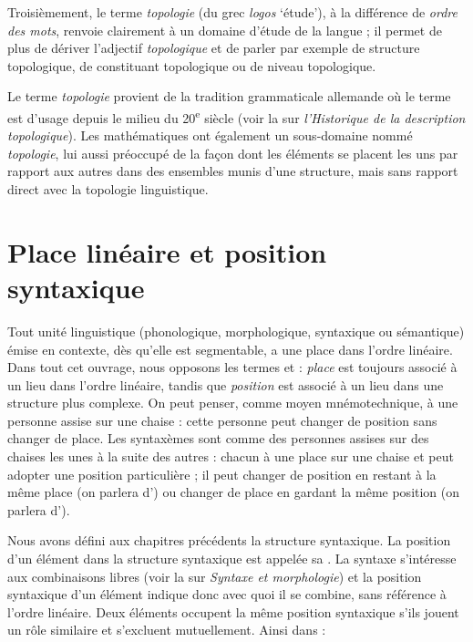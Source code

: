 Troisièmement, le terme \textit{topologie} (du grec \textit{logos} ‘étude’), à la différence de \textit{ordre des mots}, renvoie clairement à un domaine d’étude de la langue ; il permet de plus de dériver l’adjectif \textit{topologique} et de parler par exemple de structure topologique, de constituant topologique ou de niveau topologique.

Le terme \textit{topologie} provient de la tradition grammaticale allemande où le terme est d’usage depuis le milieu du 20\textsuperscript{e} siècle (voir la  sur \textit{l’Historique de la description topologique}). Les mathématiques ont également un sous-domaine nommé \textit{topologie}, lui aussi préoccupé de la façon dont les éléments se placent les uns par rapport aux autres dans des ensembles munis d’une structure, mais sans rapport direct avec la topologie linguistique.

\section{Place linéaire et position syntaxique}\label{sec:3.5.3}

Tout unité linguistique (phonologique, morphologique, syntaxique ou sémantique) émise en contexte, dès qu’elle est segmentable, a une place dans l’ordre linéaire. Dans tout cet ouvrage, nous opposons les termes  et : \textit{place} est toujours associé à un lieu dans l’ordre linéaire, tandis que \textit{position} est associé à un lieu dans une structure plus complexe. On peut penser, comme moyen mnémotechnique, à une personne assise sur une chaise : cette personne peut changer de position sans changer de place. Les syntaxèmes sont comme des personnes assises sur des chaises les unes à la suite des autres : chacun à une place sur une chaise et peut adopter une position particulière ; il peut changer de position en restant à la même place (on parlera d’) ou changer de place en gardant la même position (on parlera d’).

Nous avons défini aux chapitres précédents la structure syntaxique. La position d’un élément dans la structure syntaxique est appelée sa . La syntaxe s’intéresse aux combinaisons libres (voir la  sur \textit{Syntaxe et morphologie}) et la position syntaxique d’un élément indique donc avec quoi il se combine, sans référence à l’ordre linéaire. Deux éléments occupent la même position syntaxique s’ils jouent un rôle similaire et s’excluent mutuellement. Ainsi dans :

